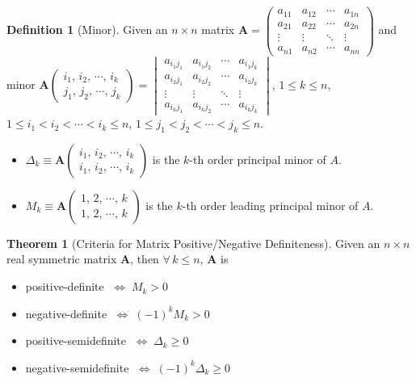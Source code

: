 \documentclass[10pt,handout]{beamer}
\newcommand{\ds}{\displaystyle}
\newcommand{\ifff}{\;\Longleftrightarrow\;}
\theoremstyle{definition}
\newtheorem*{dfn}{Definition}
\newtheorem*{thm}{Theorem}
\newcommand{\vA}{\mathbf{A}}
\begin{document}
\begin{frame}
  \begin{dfn}[Minor] 
    Given an $n\times n$ matrix $\vA = \begin{pmatrix}a_{11} & a_{12} & \cdots & a_{1n} \\ a_{21} & a_{22} & \cdots & a_{2n} \\ \vdots & \vdots & \ddots & \vdots \\ a_{n1} & a_{n2} & \cdots & a_{nn} \end{pmatrix}$ and minor $\vA\begin{pmatrix}i_1,\,i_2,\,\cdots,\,i_k\\j_1,\,j_2,\,\cdots,\,j_k\end{pmatrix} = \begin{vmatrix}a_{i_1 j_1} & a_{i_1 j_2} & \cdots & a_{i_1 j_k} \\ a_{i_2 j_1} & a_{i_2 j_2} & \cdots & a_{i_2 j_k} \\ \vdots & \vdots & \ddots & \vdots \\ a_{i_k j_1} & a_{i_k j_2} & \cdots & a_{i_k j_k} \end{vmatrix}$, $1\leqslant k\leqslant n$, $1\leqslant i_1 < i_2 < \cdots < i_k \leqslant n$, $1\leqslant j_1 < j_2 < \cdots < j_k \leqslant n$. 
    \begin{itemize}
      \item $\ds\Delta_k\equiv\vA\begin{pmatrix}i_1,\,i_2,\,\cdots,\,i_k\\i_1,\,i_2,\,\cdots,\,i_k\end{pmatrix}$ is the $k$-th order principal minor of $A$. 
      \item $\ds M_k\equiv\vA\begin{pmatrix}1,\,2,\,\cdots,\,k\\1,\,2,\,\cdots,\,k\end{pmatrix}$ is the $k$-th order leading principal minor of $A$. 
    \end{itemize}
  \end{dfn}
\end{frame}

\begin{frame}
  \begin{thm}[Criteria for Matrix Positive/Negative Definiteness] 
    Given an $n\times n$ real symmetric matrix $\vA$, then $\forall\,k\leqslant n$, $\vA$ is
    \begin{itemize}
      \item positive-definite $\ifff M_k > 0$
      \item negative-definite $\ifff (-1)^k M_k> 0$
      \item positive-semidefinite $\ifff \Delta_k \geqslant 0$
      \item negative-semidefinite $\ifff (-1)^k \Delta_k \geqslant 0$
    \end{itemize}
  \end{thm}
\end{frame}
\end{document}
